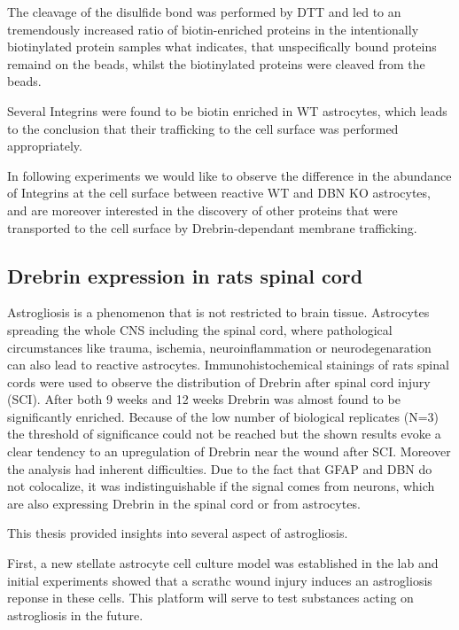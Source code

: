 \documentclass[a4paper,11pt,bibtotocnumbered]{article}
\begin{document}
The cleavage of the disulfide bond was performed by DTT and led to an tremendously increased ratio of biotin-enriched proteins in the intentionally biotinylated protein samples what indicates, that unspecifically bound proteins remaind on the beads, whilst the biotinylated proteins were cleaved from the beads.

Several Integrins were found to be biotin enriched in WT astrocytes, which leads to the conclusion that their trafficking to the cell surface was performed appropriately.  

In following experiments we would like to observe the difference in the abundance of Integrins at the cell surface between reactive WT and DBN KO astrocytes, and are moreover interested in the discovery of other proteins that were transported to the cell surface by Drebrin-dependant membrane trafficking.     


\subsection{Drebrin expression in rats spinal cord}

Astrogliosis is a phenomenon that is not restricted to brain tissue. Astrocytes spreading the whole CNS including the spinal cord, where pathological circumstances like trauma, ischemia, neuroinflammation or neurodegenaration can also lead to reactive astrocytes. Immunohistochemical stainings of rats spinal cords were used to observe the distribution of Drebrin after spinal cord injury (SCI). After both 9 weeks and 12 weeks Drebrin was almost found to be significantly enriched. Because of the low number of biological replicates (N=3) the threshold of significance could not be reached but the shown results evoke a clear tendency to an upregulation of Drebrin near the wound after SCI. Moreover the analysis had inherent difficulties. Due to the fact that GFAP and DBN do not colocalize, it was indistinguishable if the signal comes from neurons, which are also expressing Drebrin in the spinal cord or from astrocytes.



This thesis provided insights into several aspect of astrogliosis. 

First, a new stellate astrocyte cell culture model was established in the lab and  initial experiments showed that a scrathc wound injury induces an astrogliosis reponse in these cells. This platform will serve to test substances acting on astrogliosis in the future.
\end{document}
